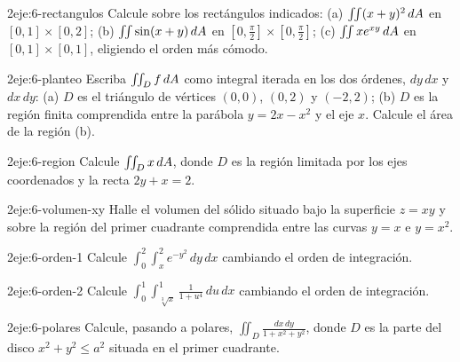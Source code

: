 \begin{ejercicio}{2}{eje:6-rectangulos}
Calcule sobre los rectángulos indicados: (a) $\iint(x+y)^2\,dA$ en $[0,1]\times[0,2]$; (b) $\iint\sin(x+y)\,dA$ en $[0,\frac\pi2]\times[0,\frac\pi2]$; (c) $\iint xe^{xy}\,dA$ en $[0,1]\times[0,1]$, eligiendo el orden más cómodo.
\end{ejercicio}

\begin{ejercicio}{2}{eje:6-planteo}
Escriba $\iint_Df\,dA$ como integral iterada en los dos órdenes, $dy\,dx$ y $dx\,dy$: (a) $D$ es el triángulo de vértices $(0,0)$, $(0,2)$ y $(-2,2)$; (b) $D$ es la región finita comprendida entre la parábola $y=2x-x^2$ y el eje $x$. Calcule el área de la región (b).
\end{ejercicio}

\begin{ejercicio}{2}{eje:6-region}
Calcule $\iint_Dx\,dA$, donde $D$ es la región limitada por los ejes coordenados y la recta $2y+x=2$.
\end{ejercicio}

\begin{ejercicio}{2}{eje:6-volumen-xy}
Halle el volumen del sólido situado bajo la superficie $z=xy$ y sobre la región del primer cuadrante comprendida entre las curvas $y=x$ e $y=x^2$.
\end{ejercicio}

\begin{ejercicio}{2}{eje:6-orden-1}
Calcule $\displaystyle\int_0^2\int_x^2e^{-y^2}\,dy\,dx$ cambiando el orden de integración.
\end{ejercicio}

\begin{ejercicio}{2}{eje:6-orden-2}
Calcule $\displaystyle\int_0^1\int_{\sqrt[3]{x}}^{1}\frac{1}{1+u^4}\,du\,dx$ cambiando el orden de integración.
\end{ejercicio}

\begin{ejercicio}{2}{eje:6-polares}
Calcule, pasando a polares, $\displaystyle\iint_D\frac{dx\,dy}{1+x^2+y^2}$, donde $D$ es la parte del disco $x^2+y^2\le a^2$ situada en el primer cuadrante.
\end{ejercicio}

